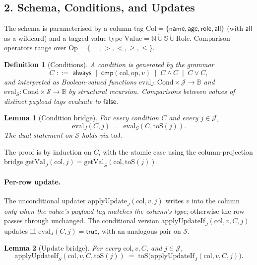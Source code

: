 \documentclass{article}
\newtheorem{lemma}{Lemma}
\newtheorem{definition}{Definition}
\begin{document}
\subsection*{2. Schema, Conditions, and Updates}

The schema is parameterised by a column tag $\mathrm{Col} = \{\mathsf{name}, \mathsf{age}, \mathsf{role}, \mathsf{all}\}$ (with $\mathsf{all}$ as a wildcard) and a tagged value type $\mathrm{Value} = \mathbb{N} \mathbin{\dot\cup} \mathbb{S} \mathbin{\dot\cup} \mathrm{Role}$. Comparison operators range over $\mathrm{Op} = \{=, >, <, \geq, \leq\}$.

\begin{definition}[Conditions]
A condition is generated by the grammar
\[
C \;::=\; \mathsf{always} \;\mid\; \mathsf{cmp}(\mathrm{col}, \mathrm{op}, v) \;\mid\; C \land C \;\mid\; C \lor C,
\]
and interpreted as Boolean-valued functions $\mathrm{eval}_J : \mathrm{Cond} \times \mathcal{J} \to \mathbb{B}$ and $\mathrm{eval}_S : \mathrm{Cond} \times \mathcal{S} \to \mathbb{B}$ by structural recursion. Comparisons between values of distinct payload tags evaluate to $\mathsf{false}$.
\end{definition}

\begin{lemma}[Condition bridge]
\label{lem:cond-bridge}
For every condition $C$ and every $j \in \mathcal{J}$,
\[
\mathrm{eval}_J(C, j) \;=\; \mathrm{eval}_S(C, \mathrm{toS}(j)).
\]
The dual statement on $\mathcal{S}$ holds via $\mathrm{toJ}$.
\end{lemma}
The proof is by induction on $C$, with the atomic case using the column-projection bridge $\mathrm{getVal}_J(\mathrm{col}, j) = \mathrm{getVal}_S(\mathrm{col}, \mathrm{toS}(j))$.

\paragraph{Per-row update.}
The unconditional updater $\mathrm{applyUpdate}_J(\mathrm{col}, v, j)$ writes $v$ into the column \emph{only when the value's payload tag matches the column's type}; otherwise the row passes through unchanged. The conditional version $\mathrm{applyUpdateIf}_J(\mathrm{col}, v, C, j)$ updates iff $\mathrm{eval}_J(C, j) = \mathsf{true}$, with an analogous pair on $\mathcal{S}$.

\begin{lemma}[Update bridge]
\label{lem:update-bridge}
For every $\mathrm{col}, v, C$, and $j \in \mathcal{J}$,
\[
\mathrm{applyUpdateIf}_S(\mathrm{col}, v, C, \mathrm{toS}(j)) \;=\; \mathrm{toS}\big(\mathrm{applyUpdateIf}_J(\mathrm{col}, v, C, j)\big).
\]
\end{lemma}
\end{document}
